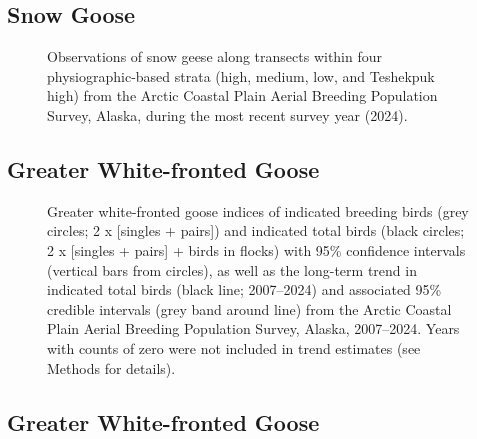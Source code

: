 \documentclass[
]{article}
\begin{document}
\endgroup{}

\newpage{}

\subsection*{Snow Goose}\label{snow-goose-2}

\begin{figure}


\caption{\label{fig-SNGOmap}Observations of snow geese along transects
within four physiographic-based strata (high, medium, low, and Teshekpuk
high) from the Arctic Coastal Plain Aerial Breeding Population Survey,
Alaska, during the most recent survey year (2024).}

\end{figure}%

\newpage{}

\subsection*{Greater White-fronted
Goose}\label{greater-white-fronted-goose}

\begin{figure}


\caption{\label{fig-GWFG}Greater white-fronted goose indices of
indicated breeding birds (grey circles; 2 x {[}singles + pairs{]}) and
indicated total birds (black circles; 2 x {[}singles + pairs{]} + birds
in flocks) with 95\% confidence intervals (vertical bars from circles),
as well as the long-term trend in indicated total birds (black line;
2007--2024) and associated 95\% credible intervals (grey band around
line) from the Arctic Coastal Plain Aerial Breeding Population Survey,
Alaska, 2007--2024. Years with counts of zero were not included in trend
estimates (see Methods for details).}

\end{figure}%

\newpage{}

\subsection*{Greater White-fronted
Goose}\label{greater-white-fronted-goose-1}
\end{document}
